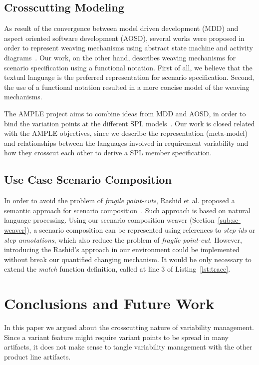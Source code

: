 \documentclass{acm_proc_article-sp}
\begin{document}
\subsection{Crosscutting Modeling}

As result of the convergence between model driven development (MDD)
and aspect oriented software development (AOSD), several works were
proposed in order to represent weaving mechanisms using abstract
state machine and activity
diagrams~\cite{noda-aom-2006,thomas-aom-2006}. Our work, on the
other hand, describes weaving mechanisms for scenario specification
using a functional notation. First of all, we believe that the
textual language is the preferred representation for scenario
specification. Second, the use of a functional notation resulted in
a more concise model of the weaving mechanisms.

The AMPLE project aims to combine ideas from MDD and AOSD, in order
to bind the variation points at the different SPL
models~\cite{ample-url}. Our work is closed related with the AMPLE
objectives, since we describe the representation (meta-model) and
relationships between the languages involved in requirement
variability and how they crosscut each other to derive a SPL member
specification.

\subsection{Use Case Scenario Composition}

In order to avoid the problem of \emph{fragile point-cuts}, Rashid
et al. proposed a semantic approach for scenario
composition~\cite{rashid-aosd-2007}. Such approach is based on
natural language processing. Using our scenario composition weaver
(Section~\ref{sub:sc-weaver}), a scenario composition can be
represented using references to \emph{step ids} or \emph{step annotations}, 
which also reduce the problem of \emph{fragile point-cut}. However,
introducing the Rashid's approach in our environment could be
implemented without break our quantified changing mechanism. It
would be only necessary to extend the \emph{match} function
definition, called at line 3 of Listing~\ref{lst:trace}.

\section{Conclusions and Future Work}\label{sec:conclusions}

In this paper we argued about the crosscutting nature of 
variability management. Since a variant feature might require
variant points to be spread in many artifacts, it does not make sense 
to tangle variability management with the other product line artifacts. 
\end{document}
